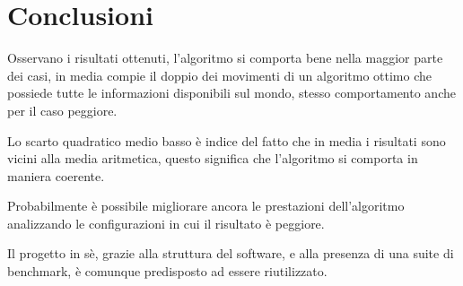 \chapter*{Conclusioni}
Osservano i risultati ottenuti, l'algoritmo si comporta bene nella maggior parte dei casi, in media compie il doppio dei movimenti di un algoritmo ottimo che possiede tutte le informazioni disponibili sul mondo, stesso comportamento anche per il caso peggiore. 

Lo scarto quadratico medio basso è indice del fatto che in media i risultati sono vicini alla media aritmetica, questo significa che l'algoritmo si comporta in maniera coerente. 

Probabilmente è possibile migliorare ancora le prestazioni dell'algoritmo analizzando le configurazioni in cui il risultato è peggiore. 

Il progetto in sè, grazie alla struttura del software, e alla presenza di una suite di benchmark, è comunque predisposto ad essere riutilizzato.